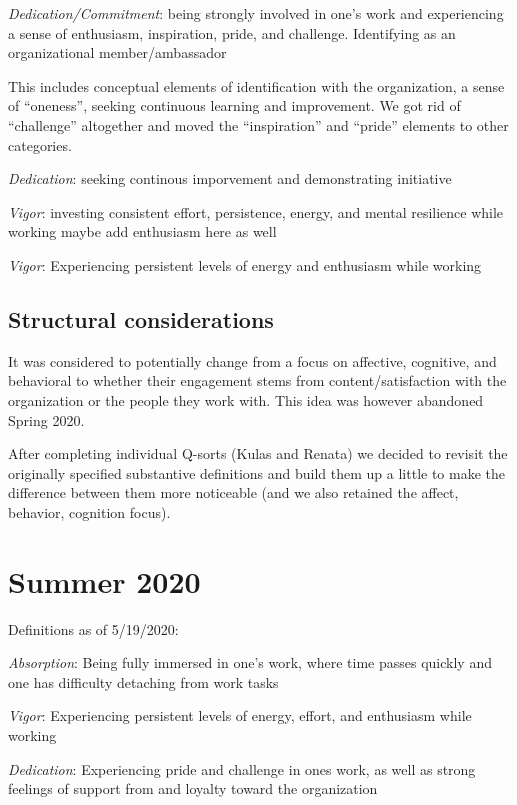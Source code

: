 \documentclass[
]{book}
\begin{document}
\emph{Dedication/Commitment}: being strongly involved in one's work and experiencing a sense of enthusiasm, inspiration, pride, and challenge. \citep{schaufeli_measurement_2002} Identifying as an organizational member/ambassador

This includes conceptual elements of identification with the organization, a sense of ``oneness'', seeking continuous learning and improvement. We got rid of ``challenge'' altogether and moved the ``inspiration'' and ``pride'' elements to other categories.

\emph{Dedication}: seeking continous imporvement and demonstrating initiative

\emph{Vigor}: investing consistent effort, persistence, energy, and mental resilience while working \citep{schaufeli_measurement_2002}
maybe add enthusiasm here as well

\emph{Vigor}: Experiencing persistent levels of energy and enthusiasm while working

\hypertarget{structural-considerations}{%
\subsection{Structural considerations}\label{structural-considerations}}

It was considered to potentially change from a focus on affective, cognitive, and behavioral to whether their engagement stems from content/satisfaction with the organization or the people they work with. This idea was however abandoned Spring 2020.

After completing individual Q-sorts (Kulas and Renata) we decided to revisit the originally specified substantive definitions and build them up a little to make the difference between them more noticeable (and we also retained the affect, behavior, cognition focus).

\hypertarget{summer-2020}{%
\section{Summer 2020}\label{summer-2020}}

Definitions as of 5/19/2020:

\emph{Absorption}: Being fully immersed in one's work, where time passes quickly and one has difficulty detaching from work tasks

\emph{Vigor}: Experiencing persistent levels of energy, effort, and enthusiasm while working

\emph{Dedication}: Experiencing pride and challenge in ones work, as well as strong feelings of support from and loyalty toward the organization
\end{document}
